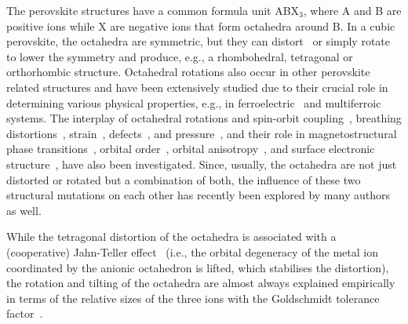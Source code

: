 \documentclass[a4paper,prb,twocolumn]{revtex4-1}  %
\begin{document}
The perovskite structures
have a common formula unit ABX$_3$,
where 
A and B are positive ions while X are negative ions 
that form octahedra around  B.
In a cubic perovskite,
the octahedra are symmetric, 
but they can 
distort~\cite{
BersukerCCR75,
KugelSPU82,
MillisN98,
TerakuraPMS07,
HalcrowRSC13,
LufasoAC04}
or simply 
rotate~\cite{
GlazerAC72, ThomasAC96,
WoodwardAC97a,WoodwardAC97b,
HowardAC98,StokesAC02,AngelPRL05}
 to lower the symmetry
and produce, e.g., a rhombohedral, tetragonal or orthorhombic structure.
Octahedral rotations also occur in other perovskite related structures
and
have been extensively 
studied
due to their crucial role in determining various physical properties,
e.g., in 
ferroelectric~\cite{GhosezNM11,
RondinelliAM12,
SchickPRB14,
SimPRB14,
LeePRL17,
WangPRL22,
ZhouPRB22,
GaoPRB23} and 
multiferroic~\cite{KhomskiiPhys09,
BenedekPRL11,
YangPRL14,
YePRB18,
ZhangPRL20,
ZhangYajunPRL20, 
ZhouPRB21,
ZhangPRL22}
systems.
The interplay of octahedral rotations
and 
spin-orbit coupling~\cite{AmatNL14,KrachJPCM23},
breathing distortions~\cite{BalachandranPRB13},
strain~\cite{Aguado-PuentePRL11},
defects~\cite{JiaPRB22}, and
pressure~\cite{XiangPRB17},
and 
their role in
magnetostructural phase transitions~\cite{JohnsonPRL20},
orbital order~\cite{OgawaPRL12,ChenPRL19}, orbital anisotropy~\cite{HuangPRB21}, 
and
surface electronic structure~\cite{MoralesPRL23},
have also been investigated.
Since, usually, the octahedra are not just %
distorted or rotated but a combination of both,
the influence of these two 
structural mutations %
on each other has recently been explored by many authors~\cite{LufasoAC04,CarpenterAC09,ChenPRL19}
as well.



While the tetragonal distortion of the octahedra is associated with
a (cooperative) Jahn-Teller 
effect~\cite{JahnPRSL37,JahnPRSL38,
OpikRS57,
Sturge68,
GehringRPP75,
BersukerCCR75,
KugelSPU82,
MillisN98,
LufasoAC04,
TerakuraPMS07,
HalcrowRSC13,
PavariniChap,
KhomskiiCR21}
(i.e., the orbital degeneracy of the metal ion coordinated by the anionic octahedron
is lifted, which stabilises the distortion),
the rotation and tilting of the octahedra are almost always 
explained empirically in terms of 
the relative sizes of the three ions
with the
Goldschmidt tolerance factor~\cite{Goldschmidt1926,KieslichCS15}. 
\end{document}
